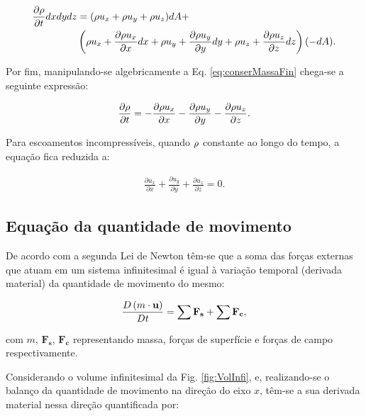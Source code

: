 \documentclass[tese_patricia]{subfiles}%
\begin{document}
\begin{align}
	\begin{split}
		\frac{\partial \rho}{\partial t}dxdydz &= (\rho u_{x} + \rho u_{y} + \rho u_{z})dA  +  \\&  \left(\rho u_{x} + \frac{\partial \rho u_{x}}{\partial x} dx + \rho u_{y} + \frac{\partial \rho u_{y}}{\partial y} dy + \rho u_{z} + \frac{\partial \rho u_{z}}{\partial z} dz\right)(-dA). 
		\label{eq:conserMassaFin} 
	\end{split}
\end{align}


Por fim, manipulando-se algebricamente a Eq. \ref{eq:conserMassaFin} chega-se a seguinte expressão:

\begin{align}
	\frac{\partial \rho}{\partial t} = - \frac{\partial \rho u_{x}}{\partial x} - \frac{\partial \rho u_{y}}{\partial y}- \frac{\partial \rho u_{z}}{\partial z}.
\end{align}

Para escoamentos incompressíveis, quando $\rho$ constante ao longo do tempo, a equação fica reduzida a:

\begin{align}
	 \frac{\partial u_{x}}{\partial x} + \frac{\partial u_{y}}{\partial y} + \frac{\partial u_{z}}{\partial z} = 0. 
	 \label{eq:conserMassaIncom} 
\end{align} 


\subsection{Equação da quantidade de movimento}

De acordo com a segunda Lei de Newton têm-se que a soma das forças externas que atuam em um sistema infinitesimal é igual à variação temporal (derivada material) da quantidade de movimento do mesmo:


\begin{align}
	\frac{D \left(m \cdot \mathbf{u}\right)}{D t} = \sum{\mathbf{F_s}} + \sum{\mathbf{F_c}}, 
	\label{eq:2LeiNewon} 
\end{align} 

\noindent com $m$, $\mathbf{F_s}$,  $\mathbf{F_c}$ representando massa, forças de superfície e forças de campo respectivamente.

Considerando o volume infinitesimal da Fig. \ref{fig:VolInfi}, e, realizando-se o balanço da quantidade de movimento na direção do eixo $x$, têm-se a sua derivada material nessa direção quantificada por:
\end{document}
